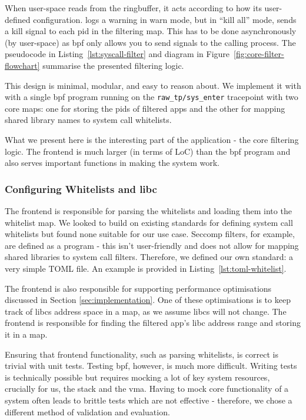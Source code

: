 When user-space reads  from the ringbuffer, it acts according to how its user-defined configuration. \af logs a warning in warn mode, but in ``kill all'' mode, sends a 
kill signal to each \ac{pid} in the filtering map. This has to be
done asynchronously (by user-space) as \ac{bpf} only allows you to send signals
to the calling process. The pseudocode in
Listing~\ref{lst:syscall-filter} and diagram in 
Figure~\ref{fig:core-filter-flowchart} summarise the presented filtering logic.

This design is minimal, modular, and easy to reason about. We implement it with
with a single \ac{bpf} program running on the \texttt{raw\_tp/sys\_enter}
tracepoint with two core maps: one for storing the \acp{pid} of filtered apps
and the other for mapping shared library names to system call whitelists.

What we present here is the interesting part of the application
- the core filtering logic. The frontend is much larger (in terms of LoC) than
the \ac{bpf} program and also serves important functions in making the system
work.

\subsubsection{Configuring Whitelists and \ac{libc}}

The frontend is responsible for parsing the \af whitelists and loading them into
the whitelist map. We looked to build on existing standards for defining
system call whitelists but found none suitable for our use case. Seccomp filters,
for example, are defined as a  program - this isn't user-friendly and
does not allow for mapping shared libraries to system call filters. Therefore, we defined our
own standard: a very simple TOML file. An example is provided in
Listing~\ref{lst:toml-whitelist}.

The frontend is also responsible for supporting performance optimisations
discussed in Section \ref{sec:implementation}. One of these optimisations is
to keep track of \acp{libc} address space in a map, as we assume \acp{libc} will not
change. The frontend is responsible for finding the filtered app's \ac{libc}
address range and storing it in a map.

Ensuring that frontend functionality, such as parsing whitelists, is correct is
trivial with unit tests. Testing \ac{bpf}, however, is much more difficult.
Writing tests is technically possible but requires mocking a lot of key system
resources, crucially for us, the stack and the \ac{vma}. Having to mock core
functionality of a system often leads to brittle tests which are not effective -
therefore, we chose a different method of validation and evaluation.

